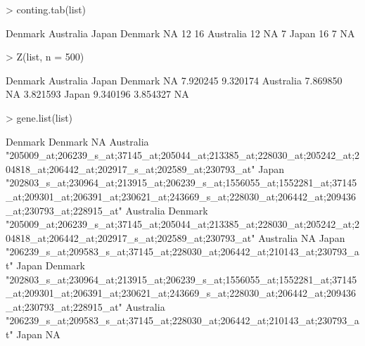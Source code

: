 \documentclass[a4paper]{report}
\begin{document}
\begin{Schunk}
\begin{Sinput}
> conting.tab(list)
\end{Sinput}
\begin{Soutput}
          Denmark Australia Japan
Denmark        NA        12    16
Australia      12        NA     7
Japan          16         7    NA
\end{Soutput}
\begin{Sinput}
> Z(list, n = 500)
\end{Sinput}
\begin{Soutput}
           Denmark Australia    Japan
Denmark         NA  7.920245 9.320174
Australia 7.869850        NA 3.821593
Japan     9.340196  3.854327       NA
\end{Soutput}
\begin{Sinput}
> gene.list(list)
\end{Sinput}
\begin{Soutput}
          Denmark                                                                                                                                                                 
Denmark   NA                                                                                                                                                                      
Australia "205009_at;206239_s_at;37145_at;205044_at;213385_at;228030_at;205242_at;204818_at;206442_at;202917_s_at;202589_at;230793_at"                                            
Japan     "202803_s_at;230964_at;213915_at;206239_s_at;1556055_at;1552281_at;37145_at;209301_at;206391_at;230621_at;243669_s_at;228030_at;206442_at;209436_at;230793_at;228915_at"
          Australia                                                                                                                   
Denmark   "205009_at;206239_s_at;37145_at;205044_at;213385_at;228030_at;205242_at;204818_at;206442_at;202917_s_at;202589_at;230793_at"
Australia NA                                                                                                                          
Japan     "206239_s_at;209583_s_at;37145_at;228030_at;206442_at;210143_at;230793_at"                                                  
          Japan                                                                                                                                                                   
Denmark   "202803_s_at;230964_at;213915_at;206239_s_at;1556055_at;1552281_at;37145_at;209301_at;206391_at;230621_at;243669_s_at;228030_at;206442_at;209436_at;230793_at;228915_at"
Australia "206239_s_at;209583_s_at;37145_at;228030_at;206442_at;210143_at;230793_at"                                                                                              
Japan     NA                                                                                                                                                                      
\end{Soutput}
\end{Schunk}
\end{document}
